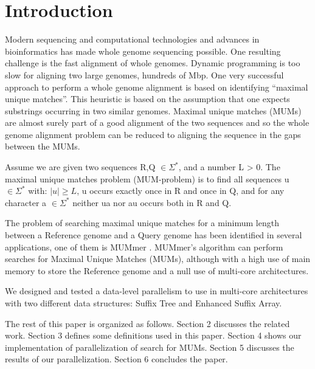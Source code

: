 \documentclass[runningheads,a5paper]{llncs}
\begin{document}
\section{Introduction} 
Modern sequencing and computational technologies and advances in bioinformatics has made whole genome sequencing possible. One resulting challenge is the fast alignment of whole genomes. Dynamic programming is too slow for aligning two large genomes, hundreds of Mbp. One very successful approach to perform a whole genome alignment is based on identifying ``maximal unique matches''. This heuristic is based on the assumption that one expects substrings occurring in two similar genomes. Maximal unique matches (MUMs) are almost surely part of a good alignment of the two sequences and so the whole genome alignment problem can be reduced to aligning the sequence in the gaps between the MUMs.
\begin{definition}
Assume we are given two sequences R,Q $\in \Sigma^*$, and a number L > 0. The maximal unique matches problem (MUM-problem) is to find all sequences u $\in \Sigma^*$ with: $|u|\geq L$, u occurs exactly once in R and once in Q, and for any character a $\in \Sigma^*$ neither ua nor au occurs both in R and Q.
\end{definition}
The problem of searching maximal unique matches for a minimum length between a Reference genome and a Query genome has been identified in several applications, one of them is MUMmer \cite{Delcher2003}. MUMmer's algorithm can perform searches for Maximal Unique Matches (MUMs), although with a high use of main memory to store the Reference genome and a null use of multi-core architectures.

We designed and tested a data-level parallelism to use in multi-core architectures with two different data structures: Suffix Tree and Enhanced Suffix Array.

The rest of this paper is organized as follows. Section 2 discusses the related work. Section 3 defines some definitions used in this paper. Section 4 shows our implementation of parallelization of search for MUMs. Section 5 discusses the results of our parallelization. Section 6 concludes the paper.
\end{document}
